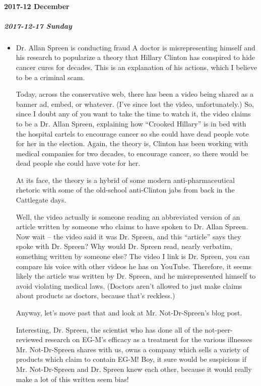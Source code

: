 \documentclass[11pt]{article}
\begin{document}
\paragraph*{2017-12 December}
\label{sec:orgbd46c00}
\startcontents[level-4]
\subparagraph*{2017-12-17 Sunday}
\label{sec:orgdf99d4f}
\begin{itemize}
\item Dr. Allan Spreen is conducting fraud
\label{sec:org7144b96}
A doctor is misrepresenting himself and his research to popularize a theory that Hillary Clinton has conspired to hide cancer cures for decades. This is an explanation of his actions, which I believe to be a criminal scam.

Today, across the conservative web, there has been a video being shared as a banner ad, embed, or whatever. (I’ve since lost the video, unfortunately.) So, since I doubt any of you want to take the time to watch it, the video claims to be a Dr. Allan Spreen, explaining how “Crooked Hillary” is in bed with the hospital cartels to encourage cancer so she could have dead people vote for her in the election. Again, the theory is, Clinton has been working with medical companies for two decades, to encourage cancer, so there would be dead people she could have vote for her.

At its face, the theory is a hybrid of some modern anti-pharmaceutical rhetoric with some of the old-school anti-Clinton jabs from back in the Cattlegate days.

Well, the video actually is someone reading an abbreviated version of an article written by someone who claims to have spoken to Dr. Allan Spreen. Now wait – the video said it was Dr. Spreen, and this “article” says they spoke with Dr. Spreen? Why would Dr. Spreen read, nearly verbatim, something written by someone else? The video I link is Dr. Spreen, you can compare his voice with other videos he has on YouTube. Therefore, it seems likely the article was written by Dr. Spreen, and he misrepresented himself to avoid violating medical laws. (Doctors aren’t allowed to just make claims about products as doctors, because that’s reckless.)

Anyway, let’s move past that and look at Mr. Not-Dr-Spreen’s blog post.

Interesting, Dr. Spreen, the scientist who has done all of the not-peer-reviewed research on EG-M’s efficacy as a treatment for the various illnesses Mr. Not-Dr-Spreen shares with us, owns a company which sells a variety of products which claim to contain EG-M! Boy, it sure would be suspicious if Mr. Not-Dr-Spreen and Dr. Spreen knew each other, because it would really make a lot of this written seem bias!


\end{itemize}
\end{document}
